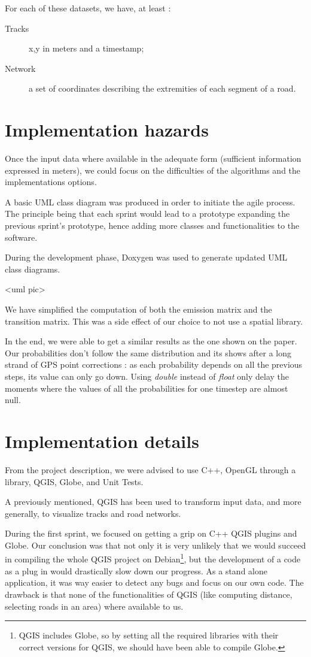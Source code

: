 For each of these datasets, we have, at least :
\begin{description}
	\item[Tracks] x,y in meters and a timestamp;
	\item[Network] a set of coordinates describing the extremities of each segment of a road.
\end{description}

\section{Implementation hazards}

Once the input data where available in the adequate form (sufficient information expressed in meters), we could focus on the difficulties of the algorithms and the implementations options. 

A basic UML class diagram was produced in order to initiate the agile process. The principle being that each sprint would lead to a prototype expanding the previous sprint's prototype, hence adding more classes and functionalities to the software.

During the development phase, Doxygen was used to generate updated UML class diagrams.

<uml pic>

We have simplified the computation of both the emission matrix and the transition matrix. This was a side effect of our choice to not use a spatial library.

In the end, we were able to get a similar results as the one shown on the paper. Our probabilities don't follow the same distribution and its shows after a long strand of GPS point corrections : as each probability depends on all the previous steps, its value can only go down. Using \textit{double} instead of \textit{float} only delay the moments where the values of all the probabilities for one timestep are almost null.  


\section{Implementation details}

From the project description, we were advised to use C++, OpenGL through a library, QGIS, Globe, and Unit Tests.

A previously mentioned, QGIS has been used to transform input data, and more generally, to visualize tracks and road networks. 

During the first sprint, we focused on getting a grip on C++ QGIS plugins and Globe. Our conclusion was that not only it is very unlikely that we would succeed in compiling the whole QGIS project on Debian\footnote{QGIS includes Globe, so by setting all the required libraries with their correct versions for QGIS, we should have been able to compile Globe.}, but the development of a code as a plug in would drastically slow down our progress. As a stand alone application, it was way easier to detect any bugs and focus on our own code. The drawback is that none of the functionalities of QGIS (like computing distance, selecting roads in an area) where available to us. 

